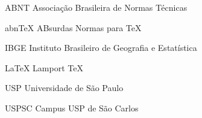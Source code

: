 \begin{siglas}
    \item[ABNT] Associação Brasileira de Normas Técnicas
    \item[abnTeX] ABsurdas Normas para TeX
	\item[IBGE] Instituto Brasileiro de Geografia e Estatística
	\item[LaTeX] Lamport TeX
	\item[USP] Universidade de São Paulo
	\item[USPSC] Campus USP de São Carlos
\end{siglas}
